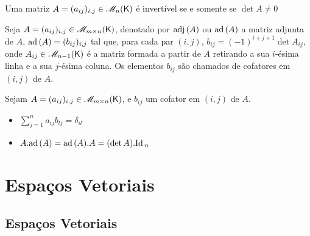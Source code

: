 \documentclass[10pt,a4paper]{book}
\begin{document}
\begin{theorem}
	Uma matriz $A = (a_{ij})_{i,j} \in \mathscr{ M }_{n}(\mathsf{ K })$ é invertível se e somente se $\det A \neq 0$
\end{theorem}

\begin{definition}
	Seja $A = (a_{ij})_{i,j} \in \mathscr{ M }_{m \times n}(\mathsf{ K })$, denotado por $\mathrm{ adj }\,(A)$ ou $\mathrm{ ad }\,(A)$ a matriz adjunta de $A$, $\mathrm{ ad }\,(A) = (b_{ij})_{i,j}$ tal que, para cada par $(i, j)$, $b_{ij} = (-1)^{i + j + 1}\det A_{ij}$, onde $A_{ij} \in \mathscr{ M }_{n - 1}(\mathsf{ K })$ é a matriz formada a partir de $A$ retirando a sua $i$-ésima linha e a sua $j$-ésima coluna. Os elementos $b_{ij}$ são chamados de cofatores em $(i, j)$ de $A$.
\end{definition}

\begin{lemma}
	Sejam $A = (a_{ij})_{i,j} \in \mathscr{ M }_{m \times n}(\mathsf{ K })$, e $b_{ij}$ um cofator em $(i, j)$ de $A$.
	\begin{itemize}
		\item $\displaystyle \sum_{j = 1}^{n} a_{ij}b_{lj} = \delta_{il}$
		\item $A.\mathrm{ ad }\,(A) = \mathrm{ ad }\,(A).A = (\det A) . \mathrm{ Id }\,_n$
	\end{itemize}
\end{lemma}


\chapter{Espaços Vetoriais}




\section{Espaços Vetoriais}
\end{document}
